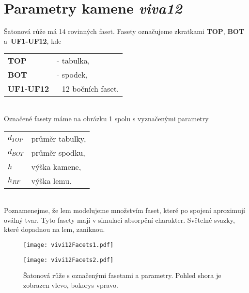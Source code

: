 \part{Parametry kamene \textit{viva12}}
\label{sec: parametryVIVA12}

Šatonová růže má 14 rovinných faset. Fasety označujeme zkratkami \textbf{TOP}, \textbf{BOT} a~\textbf{UF1-UF12}, kde

\begin{tabular}{l l}
\textbf{TOP} & - tabulka,\\
\textbf{BOT} & - spodek,\\
\textbf{UF1-UF12} & - 12 bočních faset.\\
\end{tabular}\\

Označené fasety máme na obrázku \ref{fig:viva12Params} spolu s vyznačenými parametry

\begin{tabular}{l l}
$d_{TOP}$ & průměr tabulky,\\
$d_{BOT}$ & průměr spodku,\\
$h$ & výška kamene,\\
$h_{RF}$ & výška lemu. 
\end{tabular}\\
 
Poznamenejme, že lem modelujeme množstvím faset, které po spojení aproximují oválný tvar. Tyto fasety mají v simulaci absorpční charakter. Světelné svazky, které dopadnou na lem, zaniknou.   

\begin{figure}[htps]
\centering
\begin{minipage}[c]{0.4\textwidth}
\texttt{[image: vivi12Facets1.pdf]}
\end{minipage}
\begin{minipage}[c]{0.56\textwidth}
\texttt{[image: vivi12Facets2.pdf]}
\end{minipage}
\caption{Šatonová růže s označenými fasetami a parametry. Pohled shora je zobrazen vlevo, bokorys vpravo.}
\label{fig:viva12Params}
\end{figure}



\clearpage




